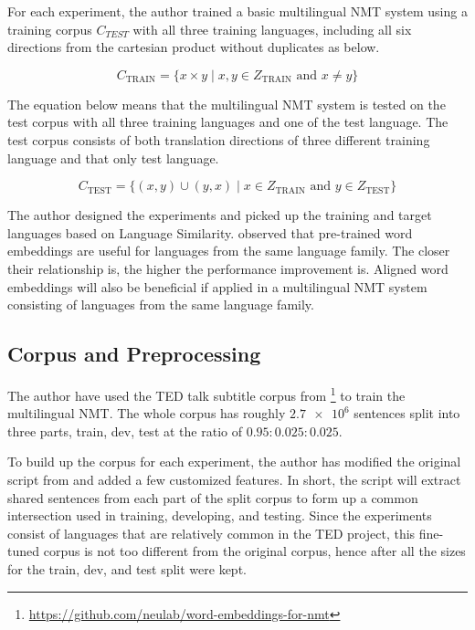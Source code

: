 \documentclass[thesis,fonts=libertine]{cluu}
\begin{document}
For each experiment, the author trained a basic multilingual NMT system using a training corpus $C_{TEST}$ with all three training languages, including all six directions from the cartesian product without duplicates as below.

\begin{equation}
  C_{\text{TRAIN}} = \{x \times y \mid x, y \in Z_{\text{TRAIN}} \text{ and } x \neq y\}
\end{equation}

The equation below means that the multilingual NMT system is tested on the test corpus with all three training languages and one of the test language. The test corpus consists of both translation directions of three different training language and that only test language.

\begin{equation}
  C_{\text{TEST}} = \{(x, y)\cup(y,x) \mid x \in Z_{\text{TRAIN}} \text{ and } y \in Z_{\text{TEST}}\}
\end{equation}

The author designed the experiments and picked up the training and target languages based on Language Similarity. \cite{Qi:2018aa} observed that pre-trained word embeddings are useful for languages from the same language family. The closer their relationship is, the higher the performance improvement is. Aligned word embeddings will also be beneficial if applied in a multilingual NMT system consisting of languages from the same language family.

\subsection{Corpus and Preprocessing}

The author have used the TED talk subtitle corpus from \cite{Qi:2018aa} \footnote{\url{https://github.com/neulab/word-embeddings-for-nmt}} to train the multilingual NMT. The whole corpus has roughly $\num{2.7e6}$ sentences split into three parts, train, dev, test at the ratio of $0.95:0.025:0.025$.

To build up the corpus for each experiment, the author has modified the original script from \cite{Qi:2018aa} and added a few customized features. In short, the script will extract shared sentences from each part of the split corpus to form up a common intersection used in training, developing, and testing. Since the experiments consist of languages that are relatively common in the TED project, this fine-tuned corpus is not too different from the original corpus, hence after all the sizes for the train, dev, and test split were kept.
\end{document}
